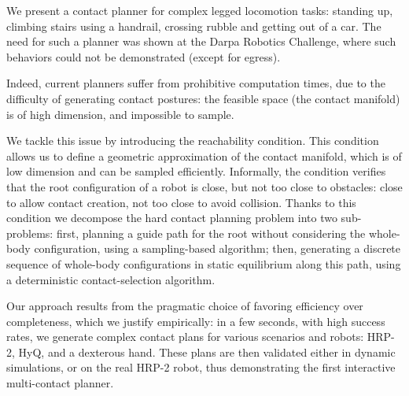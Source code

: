 We present a contact planner for complex legged locomotion tasks: standing up, climbing stairs using a handrail, crossing rubble and getting out of a car. The need for such a planner was shown at the Darpa Robotics Challenge, where such behaviors
could not be demonstrated (except for egress).

Indeed, current planners suffer from prohibitive computation times, due to the difficulty
of generating contact postures: the feasible space (the contact manifold) is of high dimension,
and impossible to sample.

We tackle this issue by introducing the reachability condition. This condition allows us to define
a geometric approximation of the contact manifold, which is of low dimension and can be sampled efficiently.
Informally, the condition verifies that the root configuration of a robot is close, but not too close to obstacles: close to allow contact creation, not too close to avoid collision. Thanks to this condition we decompose the hard contact planning problem into two
sub-problems: first, planning a guide path for the root without considering the whole-body configuration, using a sampling-based algorithm; then, generating a discrete sequence of whole-body configurations in static equilibrium along this path, using a deterministic contact-selection algorithm. 

Our approach results from the pragmatic choice of favoring efficiency over completeness, which we justify empirically: in a
few seconds, with high success rates, we generate complex contact plans for various scenarios and robots: HRP-2, HyQ, and a dexterous hand. These plans are then validated either in dynamic simulations, or on the real HRP-2 robot, thus demonstrating 
the first interactive multi-contact planner.
